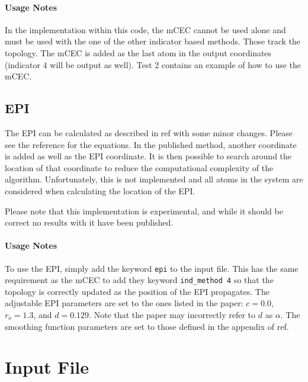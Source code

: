 \documentclass{article}
\begin{document}
\paragraph{Usage Notes}
In the implementation within this code, the mCEC cannot be used alone and must be used with the one of the other indicator based methods.
Those track the topology.
The mCEC is added as the last atom in the output coordinates (indicator 4 will be output as well).
Test 2 contains an example of how to use the mCEC.

\subsection{EPI}
The EPI can be calculated as described in ref\cite{Watanabe2020} with some minor changes.
Please see the reference for the equations. In the published method, another coordinate is added as well as the EPI coordinate.
It is then possible to search around the location of that coordinate to reduce the computational complexity of the algorithm.
Unfortunately, this is not implemented and all atoms in the system are considered when calculating the location of the EPI.

Please note that this implementation is experimental, and while it should be correct no results with it have been published.

\paragraph{Usage Notes}
To use the EPI, simply add the keyword \texttt{epi} to the input file.
This has the same requirement as the mCEC to add they keyword \texttt{ind\_method 4} so that the topology is correctly updated as the position of the EPI propagates.
The adjustable EPI parameters are set to the ones listed in the paper: $c = 0.0$, $r_o = 1.3$, and $d = 0.129$.
Note that the paper may incorrectly refer to $d$ as $\alpha$.
The smoothing function parameters are set to those defined in the appendix of ref\cite{Watanabe2020}.

\section{Input File}
\end{document}
